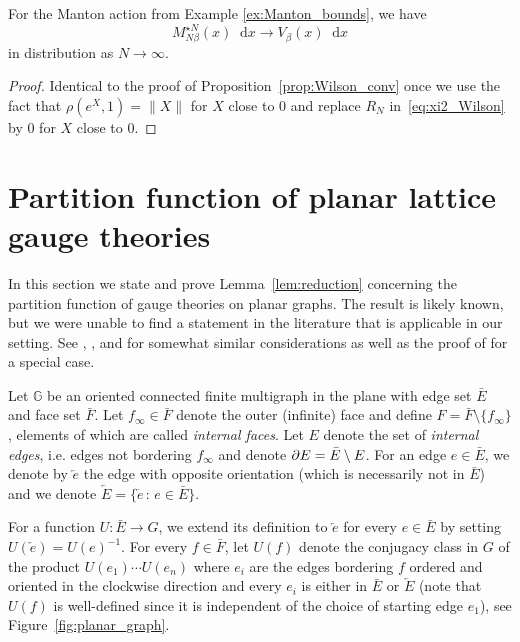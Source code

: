 \documentclass[11pt]{preprint}
\newcommand{\G}{\mathbb{G}}
\newcommand{\mrd}{\mathop{}\!\mathrm{d}}
\begin{document}
\begin{proposition}\label{prop:Manton_conv}
For the Manton action from Example \ref{ex:Manton_bounds}, we have 
\[
M_{N\beta}^{\star N}(x) \mrd x \to V_\beta(x)\mrd x
\]
 in distribution as $N\to\infty$.
\end{proposition}

\begin{proof}
Identical to the proof of Proposition~\ref{prop:Wilson_conv} once we use the fact that $\rho(e^X,1) = \|X\|$ for $X$ close to $0$ and replace $R_N$ in~\eqref{eq:xi2_Wilson} by $0$ for $X$ close to $0$.
\end{proof}

\section{Partition function of planar lattice gauge theories}\label{s.commute}

In this section we state and prove Lemma~\ref{lem:reduction} concerning the partition function of gauge theories on planar graphs.
The result is likely known, but we were unable to find a statement in the literature that is applicable in our setting.
See \cite[Sec.~1.6]{Levy03}, \cite[Thm.~6.4]{Driver89},
and \cite[Sec.~2.3]{Witten91} for somewhat similar considerations as well as the proof of \cite[Thm.~5.3]{Chevyrev19YM} for a special case.

Let $\G$ be an oriented connected finite multigraph in the plane with edge set $\bar E$ and face set $\bar F$.
Let $f_\infty\in \bar F$ denote the outer (infinite) face and define $F = \bar F\setminus \{f_\infty\}$,
elements of which are called \textit{internal faces}.
Let $E$ denote the set of \textit{internal edges}, i.e. edges not bordering $f_\infty$
and denote $\partial E = \bar E\setminus E$.
For an edge $e\in \bar E$, we denote by $\overleftarrow{e}$ the edge with opposite orientation (which is necessarily not in $\bar E$)
and we denote $\overleftarrow{E} = \{\overleftarrow{e} \,:\, e\in \bar E\}$.

For a function $U\colon \bar E \to G$, we extend its definition to $\overleftarrow{e}$ for every $e\in \bar E$ by setting $U(\overleftarrow{e})=U(e)^{-1}$.
For every $f\in \bar F$, let $U(f)$ denote the conjugacy class in $G$ of the product $U(e_1)\cdots U(e_n)$ where $e_i$ are the edges bordering $f$ ordered and oriented in the clockwise direction
and every $e_i$ is either in $\bar E$ or $\overleftarrow{E}$ 
(note that $U(f)$ is well-defined since it is independent of the choice of starting edge $e_1$),
see Figure~\ref{fig:planar_graph}.
\end{document}
